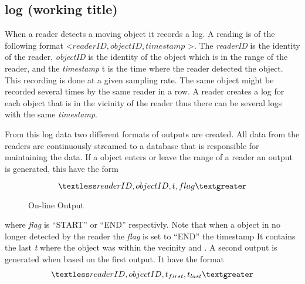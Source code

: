 \subsection{log (working title)}

When a reader detects a moving object it records a log. 
A reading is of the following format \textless $readerID,objectID,timestamp$ \textgreater.
The \textit{readerID} is the identity of the reader, \textit{objectID} is the identity of the object which is in the range of the reader, and the \textit{timestamp} t is the time where the reader detected the object.
This recording is done at a given sampling rate. 
The same object might be recorded several times by the same reader in a row. 
A reader creates a log for each object that is in the vicinity of the reader thus there can be several logs with the same \textit{timestamp}.

From this log data two different formats of outputs are created.
All data from the readers are continuously streamed to a database that is responsible for maintaining the data.
If a object enters or leave the range of a reader an output is generated, this have the form
\begin{figure}[H]
\[ \textless readerID,objectID,t,flag \textgreater \]
\caption{On-line Output}
\end{figure}

where \textit{flag} is "`START"' or "`END"' respectivly. 
Note that when a object in no longer detected by the reader  the \textit{flag} is set to "`END"' the timestamp It contains the last \textit{t} where the object was within the vecinity and .
A second output is generated when  based on the first output. 
It have the format 
\begin{align}
\textless\textit{$readerID,objectID,t_{first},t_{last}$}\textgreater
\end{align}


 

